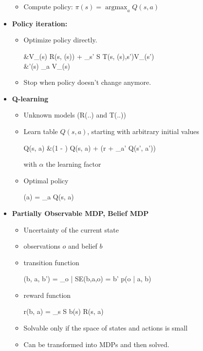 \documentclass[10pt,a4paper,landscape]{article}
\makeatletter
\DeclareMathOperator*{\argmax}{argmax}
\newenvironment{myalign*}{%
  \setlength{\abovedisplayskip}{3pt}%
  \setlength{\belowdisplayskip}{3pt}%
  \start@align\@ne\st@rredtrue\m@ne
}%
{\endalign}
\makeatother
\begin{document}
\begin{multicols*}{2}
\begin{itemize}
\begin{itemize}
		\item Compute policy: $\pi(s) = \argmax_{a} Q(s, a)$
	\end{itemize}
	\item \textbf{Policy iteration:}
	\begin{itemize}
		\item Optimize policy directly. 
		\begin{myalign*}
		    &V_{\pi}(s) \leftarrow R(s, \pi(s)) + \gamma \sum_{s' \in S} T(s, \pi(s),s')V_{\pi}(s')\\
		    &\pi'(s) \leftarrow \argmax_{a} V_{\pi}(s)
		\end{myalign*}
		\item Stop when policy doesn't change anymore.
	\end{itemize}
	\item \textbf{Q-learning}
	\begin{itemize}
		\item Unknown models (R(..) and T(..))
		\item Learn table $Q(s, a)$, starting with arbitrary initial values
		\begin{myalign*}
		    Q(s, a) &\leftarrow (1 - \alpha) Q(s, a) + \alpha (r + \gamma \max_{a'} Q(s', a'))
		\end{myalign*}
		with $\alpha$ the learning factor
		\item Optimal policy
		\begin{myalign*}
		    \pi(a) = \argmax_{a} Q(s, a)
		\end{myalign*}
	\end{itemize}
	\item \textbf{Partially Observable MDP, Belief MDP}
	\begin{itemize}
		\item Uncertainty of the current state
		\item observations $o$ and belief $b$
		\item transition function
		\begin{myalign*}
		    \tau(b, a, b') = \sum_{o | SE(b,a,o) = b'} p(o | a, b)
		\end{myalign*}
		\item reward function
		\begin{myalign*}
		     r(b, a) = \sum_{s \in S} b(s) R(s, a)
		 \end{myalign*} 
		 \item Solvable only if the space of states and actions is small
		 \item Can be transformed into MDPs and then solved.
	\end{itemize}
\end{itemize}


\end{multicols*}
\end{document}
